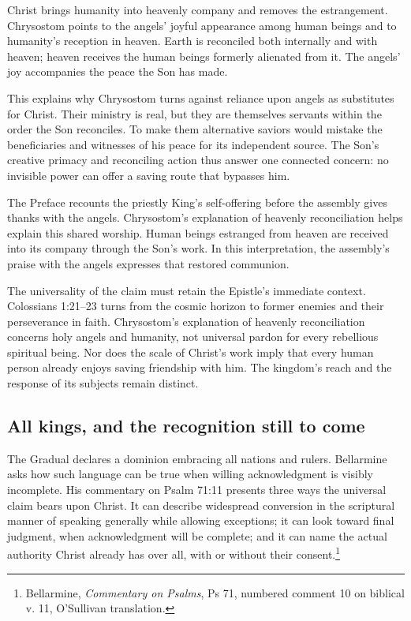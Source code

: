 Christ brings humanity into heavenly company and removes the estrangement. Chrysostom points to the angels' joyful appearance among human beings and to humanity's reception in heaven. Earth is reconciled both internally and with heaven; heaven receives the human beings formerly alienated from it. The angels' joy accompanies the peace the Son has made.

This explains why Chrysostom turns against reliance upon angels as substitutes for Christ. Their ministry is real, but they are themselves servants within the order the Son reconciles. To make them alternative saviors would mistake the beneficiaries and witnesses of his peace for its independent source. The Son's creative primacy and reconciling action thus answer one connected concern: no invisible power can offer a saving route that bypasses him.

The Preface recounts the priestly King's self-offering before the assembly gives thanks with the angels. Chrysostom's explanation of heavenly reconciliation helps explain this shared worship. Human beings estranged from heaven are received into its company through the Son's work. In this interpretation, the assembly's praise with the angels expresses that restored communion.

The universality of the claim must retain the Epistle's immediate context. Colossians 1:21--23 turns from the cosmic horizon to former enemies and their perseverance in faith. Chrysostom's explanation of heavenly reconciliation concerns holy angels and humanity, not universal pardon for every rebellious spiritual being. Nor does the scale of Christ's work imply that every human person already enjoys saving friendship with him. The kingdom's reach and the response of its subjects remain distinct.

\subsection{All kings, and the recognition still to come}
The Gradual declares a dominion embracing all nations and rulers. Bellarmine asks how such language can be true when willing acknowledgment is visibly incomplete. His commentary on Psalm 71:11 presents three ways the universal claim bears upon Christ. It can describe widespread conversion in the scriptural manner of speaking generally while allowing exceptions; it can look toward final judgment, when acknowledgment will be complete; and it can name the actual authority Christ already has over all, with or without their consent.\footnote{Bellarmine, \emph{Commentary on Psalms}, Ps 71, numbered comment 10 on biblical v. 11, O'Sullivan translation.}

